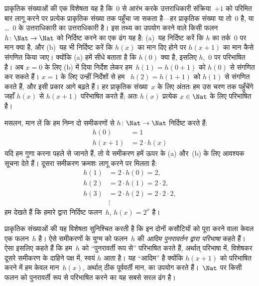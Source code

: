 \documentclass[../../../include/open-logic-section]{subfiles}
\begin{document}

प्राकृतिक संख्याओं की एक विशेषता यह है कि~$0$ से आरंभ करके उत्तराधिकारी
संक्रिया~$+1$ को परिमित बार लागू करने पर प्रत्येक प्राकृतिक संख्या तक पहुँचा जा सकता
है---हर प्राकृतिक संख्या या तो~$0$ है, या \dots{}~$0$ के उत्तराधिकारी
का उत्तराधिकारी है। इस तथ्य का उपयोग करने वाले किसी फलन
~$h\colon\Nat \to \Nat$ को निर्दिष्ट करने का एक ढंग यह है: (a)~यह
निर्दिष्ट करें कि $h$ का तर्क~$0$ पर मान क्या है, और (b)~यह भी निर्दिष्ट
करें कि $h(x)$ का मान दिए होने पर $h(x+1)$ का मान कैसे संगणित किया जाए।
क्योंकि (a) हमें सीधे बताता है कि $h(0)$ क्या है, इसलिए $h$,~$0$ पर
परिभाषित है। अब $x=0$ के लिए (b) में दिया निर्देश लेकर हम~$h(1) = h(0+1)$ को
$h(0)$ से संगणित कर सकते हैं। $x=1$ के लिए उन्हीं निर्देशों से हम
~$h(2) = h(1+1)$ को $h(1)$ से संगणित करते हैं, और इसी प्रकार आगे बढ़ते हैं।
हर प्राकृतिक संख्या~$x$ के लिए अंततः हम उस चरण तक पहुँचेंगे जहाँ $h(x)$
से $h(x+1)$ परिभाषित करते हैं; अतः $h(x)$ प्रत्येक $x \in \Nat$ के
लिए परिभाषित है।

मसलन, मान लें कि हम निम्न दो समीकरणों से $h\colon \Nat \to \Nat$
निर्दिष्ट करते हैं:
\begin{align*}
h(0) & =  1\\
h(x+1) & =  2 \cdot h(x)
\end{align*}
यदि हम गुणा करना पहले से जानते हैं, तो ये समीकरण हमें ऊपर के (a) और~(b)
के लिए आवश्यक सूचना देते हैं। दूसरा समीकरण क्रमशः लागू करने पर मिलता है:
\begin{align*}
  h(1) & = 2\cdot h(0) = 2,\\
  h(2) & = 2\cdot h(1) = 2\cdot 2,\\
  h(3) & = 2 \cdot h(2) = 2\cdot 2 \cdot 2,\\
  & \vdots
\end{align*}
हम देखते हैं कि हमारे द्वारा निर्दिष्ट फलन~$h$, $h(x) = 2^x$ है।

प्राकृतिक संख्याओं की यह विशेषता सुनिश्चित करती है कि इन दोनों कसौटियों
को पूरा करने वाला केवल एक फलन~$h$ है। ऐसे समीकरणों के युग्म को फलन~$h$
की \emph{आदिम पुनरावर्तन द्वारा परिभाषा} कहते हैं। ऐसा इसलिए कहते हैं कि
हम~$h$ को ``पुनरावर्ती रूप से'' परिभाषित करते हैं, अर्थात् परिभाषा में,
विशेषकर दूसरे समीकरण के दाहिने पक्ष में, स्वयं $h$ आता है। यह ``आदिम''
है क्योंकि $h(x+1)$ को परिभाषित करने में हम केवल मान~$h(x)$, अर्थात् ठीक
पूर्ववर्ती मान, का उपयोग करते हैं।~$\Nat$ पर किसी फलन को पुनरावर्ती रूप
से परिभाषित करने का यह सबसे सरल ढंग है।
\end{document}
